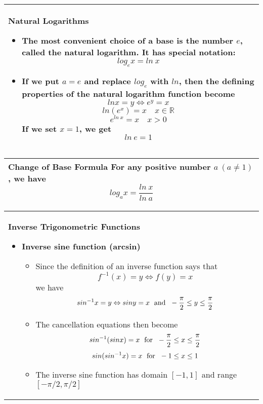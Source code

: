 \documentclass[fleqn]{article}
\begin{document}
\begin{center}
\def\arraystretch{1.3}
{\setlength{\tabcolsep}{16pt}
\begin{tabularx}{.9\textwidth}{|X|}
\hline
	\vspace{1pt}
	\textbf{Natural Logarithms}
	\begin{itemize}
	\item The most convenient choice of a base is the number $e$, called the \textbf{natural logarithm}. It has special notation:
	$$log_e x = ln \: x$$
	\item If we put $a = e$ and replace $log_e$ with $ln$, then the defining properties of the natural logarithm function become
	$$ln x = y \Leftrightarrow e^y = x$$
	$$ln(e^x) = x \hspace{12pt} x \in \mathbb{R}$$
	$$e^{ln\:x} = x \hspace{12pt} x > 0$$
	If we set $x=1$, we get
	$$ln \: e = 1$$
	
	\end{itemize}
	\\
\hline
\end{tabularx}}
\vspace{12pt}

\def\arraystretch{1.3}
{\setlength{\tabcolsep}{16pt}
\begin{tabularx}{.9\textwidth}{|X|}
\hline
	\vspace{1pt}
	\textbf{Change of Base Formula} \:\: For any positive number $a \: (a \ne 1)$, we have
	$$log_a x = \dfrac{ln \: x}{ln \: a}$$
	\\
\hline
\end{tabularx}}
\vspace{12pt}


\def\arraystretch{1.3}
{\setlength{\tabcolsep}{16pt}
\begin{tabularx}{.9\textwidth}{|X|}
\hline
	\vspace{1pt}
	\textbf{Inverse Trigonometric Functions}
	\begin{itemize}
	\item \textbf{Inverse sine function (arcsin)}
	\begin{itemize}
		\item Since the definition of an inverse function says that
		$$f^{-1}(x) = y \Leftrightarrow f(y) = x$$
		we have
		$$sin^{-1} x = y \Leftrightarrow siny = x \text{\hspace{3pt} and \hspace{3pt}} -\dfrac{\pi}{2} \le y \le \dfrac{\pi}{2}$$
		\item The cancellation equations then become
		$$sin^{-1}(sinx) = x \text{\hspace{3pt} for \hspace{3pt}} -\dfrac{\pi}{2} \le x \le \dfrac{\pi}{2}$$
		$$sin(sin^{-1} x) = x \text{\hspace{3pt} for \hspace{3pt}} -1 \le x \le 1$$
		\item The inverse sine function has domain $[-1, 1]$ and range $[-\pi/2, \pi/2]$
	\end{itemize}
	\vspace{5pt}


\end{itemize}
\end{tabularx}}
\end{center}
\end{document}
